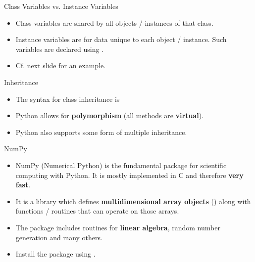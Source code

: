 \begin{dwHeaderFrame}{Class Variables vs. Instance Variables}
	\begin{itemize}
		\item Class variables are shared by all objects / instances of that class.
		\item Instance variables are for data unique to each object / instance. Such variables are declared using .
		\item Cf. next slide for an example.
	\end{itemize}
\end{dwHeaderFrame}


\begin{frame}
	
\end{frame}


\begin{dwHeaderFrame}{Inheritance}
	\begin{itemize}
		\item The syntax for class inheritance is 
		\item Python allows for \textbf{polymorphism} (all methods are \textbf{virtual}).
		\item Python also supports some form of multiple inheritance.
	\end{itemize}
\end{dwHeaderFrame}



\begin{dwHeaderFrame}{NumPy}
	\begin{itemize}
		\item NumPy (Numerical Python) is the fundamental package for scientific computing with Python.
			It is mostly implemented in C and therefore \textbf{very fast}.
		\item It is a library which defines \textbf{multidimensional array objects} () along with functions / routines
			that can operate on those arrays.
		\item The package includes routines for \textbf{linear algebra}, random number generation and many others.
		\item Install the package using .
	\end{itemize}
\end{dwHeaderFrame}


